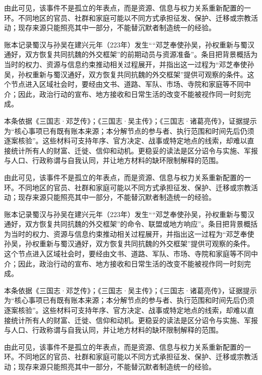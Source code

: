 由此可见，该事件不是孤立的年表点，而是资源、信息与权力关系重新配置的一环。不同地区的官员、社群和家庭可能以不同方式承担征发、保护、迁移或宗教活动；现存来源只能照亮其中一部分，不能替沉默者制造统一的经验。

账本记录蜀汉与孙吴在建兴元年（223年）发生““邓芝奉使孙吴，孙权重新与蜀汉通好，双方恢复共同抗魏的外交框架”的前期动员与资源准备”。条目把背景概括为当时的权力、资源与信息约束推动相关过程展开，并指出这一过程为“邓芝奉使孙吴，孙权重新与蜀汉通好，双方恢复共同抗魏的外交框架”提供可观察的条件。这个节点进入区域社会时，要经由文书、道路、军队、市场、寺院和家庭等不同中介；因此，政治行动的宣布、地方接收和日常生活的改变不能被视作同一时刻完成。

本条依据《三国志·邓芝传》；《三国志·吴主传》；《三国志·诸葛亮传》，证据提示为“核心事项已有既有账本来源；本分解节点的参与者、执行范围和时间先后仍须逐案核验”。这些材料可支持年序、官方决定、战事或特定地点的线索，却难以直接统计所有人的财富、迁徙、信仰和动机。更稳妥的读法是区分诏令与实施、军报与人口、行政称谓与自我认同，并让地方材料的缺环限制解释的范围。

由此可见，该事件不是孤立的年表点，而是资源、信息与权力关系重新配置的一环。不同地区的官员、社群和家庭可能以不同方式承担征发、保护、迁移或宗教活动；现存来源只能照亮其中一部分，不能替沉默者制造统一的经验。

账本记录蜀汉与孙吴在建兴元年（223年）发生““邓芝奉使孙吴，孙权重新与蜀汉通好，双方恢复共同抗魏的外交框架”的命令、联盟或地方响应”。条目把背景概括为当时的权力、资源与信息约束推动相关过程展开，并指出这一过程为“邓芝奉使孙吴，孙权重新与蜀汉通好，双方恢复共同抗魏的外交框架”提供可观察的条件。这个节点进入区域社会时，要经由文书、道路、军队、市场、寺院和家庭等不同中介；因此，政治行动的宣布、地方接收和日常生活的改变不能被视作同一时刻完成。

本条依据《三国志·邓芝传》；《三国志·吴主传》；《三国志·诸葛亮传》，证据提示为“核心事项已有既有账本来源；本分解节点的参与者、执行范围和时间先后仍须逐案核验”。这些材料可支持年序、官方决定、战事或特定地点的线索，却难以直接统计所有人的财富、迁徙、信仰和动机。更稳妥的读法是区分诏令与实施、军报与人口、行政称谓与自我认同，并让地方材料的缺环限制解释的范围。

由此可见，该事件不是孤立的年表点，而是资源、信息与权力关系重新配置的一环。不同地区的官员、社群和家庭可能以不同方式承担征发、保护、迁移或宗教活动；现存来源只能照亮其中一部分，不能替沉默者制造统一的经验。

